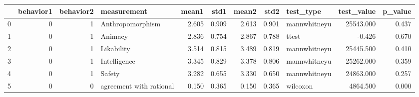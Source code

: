 \begin{tabular}{lrrlrrrrlrr}
\toprule
{} &  behavior1 &  behavior2 &              measurement &  mean1 &   std1 &  mean2 &   std2 &     test\_type &  test\_value &  p\_value \\
\midrule
0 &          0 &          1 &         Anthropomorphism &  2.605 &  0.909 &  2.613 &  0.901 &  mannwhitneyu &   25543.000 &    0.437 \\
1 &          0 &          1 &                  Animacy &  2.836 &  0.754 &  2.867 &  0.788 &         ttest &      -0.426 &    0.670 \\
2 &          0 &          1 &               Likability &  3.514 &  0.815 &  3.489 &  0.819 &  mannwhitneyu &   25445.500 &    0.410 \\
3 &          0 &          1 &             Intelligence &  3.345 &  0.829 &  3.378 &  0.806 &  mannwhitneyu &   25262.000 &    0.359 \\
4 &          0 &          1 &                   Safety &  3.282 &  0.655 &  3.330 &  0.650 &  mannwhitneyu &   24863.000 &    0.257 \\
5 &          0 &          0 &  agreement with rational &  0.150 &  0.365 &  0.150 &  0.365 &      wilcoxon &    4864.500 &    0.000 \\
\bottomrule
\end{tabular}
